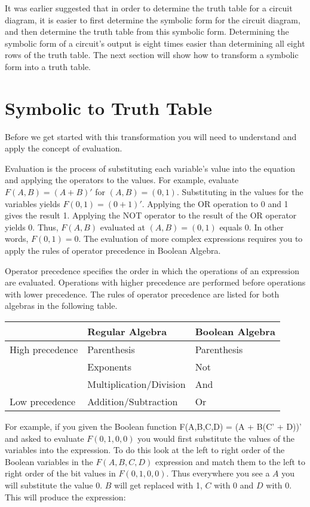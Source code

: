It was earlier suggested that in order to determine the truth table for a
circuit diagram, it is easier to first determine the symbolic form for
the circuit diagram, and then determine the truth table from this symbolic
form.  Determining the symbolic form of a circuit's output is eight times
easier than determining all eight rows of the truth table.
The next section will show how to transform a symbolic
form into a truth table.

\section{Symbolic to Truth Table}

Before we get started with this transformation you will need
to understand and apply the concept of evaluation.

Evaluation is the process
of substituting each variable's value into the equation and applying
the operators to the values.  For example, evaluate $F(A,B) = (A+B)'$
for $(A,B) = (0,1)$.  Substituting in the values for the variables
yields $F(0,1) = (0+1)'$.  Applying the OR operation to 0 and 1 gives the
result 1.  Applying the NOT operator to the result of the OR operator yields 0.
Thus, $F(A,B)$ evaluated at $(A,B)=(0,1)$ equals 0.  In other words,
$F(0,1)=0$.  The evaluation of more complex expressions requires
you to apply the rules of operator precedence in Boolean Algebra.

Operator precedence specifies the order in which the
operations of an expression are evaluated.  Operations with higher precedence
are performed before operations with lower precedence.  The rules of operator
precedence are listed for both algebras in the following table.

\begin{tabular}[ht]{l|l|l}
& Regular Algebra            & Boolean Algebra \\ \hline \hline
High precedence    & Parenthesis            & Parenthesis    \\ \hline
& Exponents                & Not            \\ \hline
& Multiplication/Division    & And            \\ \hline
Low precedence    & Addition/Subtraction         & Or             \\
\end{tabular}

For example, if you given the Boolean function F(A,B,C,D) = (A + B(C' + D))'
and asked to evaluate $F(0,1,0,0)$ you would first substitute the values of
the variables into the expression. To do this look at the left to right order
of the Boolean variables in the $F(A,B,C,D)$ expression and match them to the
left to right order of the bit values in $F(0,1,0,0)$.  Thus everywhere you see a
$A$ you will substitute the value 0.  $B$ will get replaced with 1, $C$ with 0
and $D$ with 0.  This will produce the expression:

